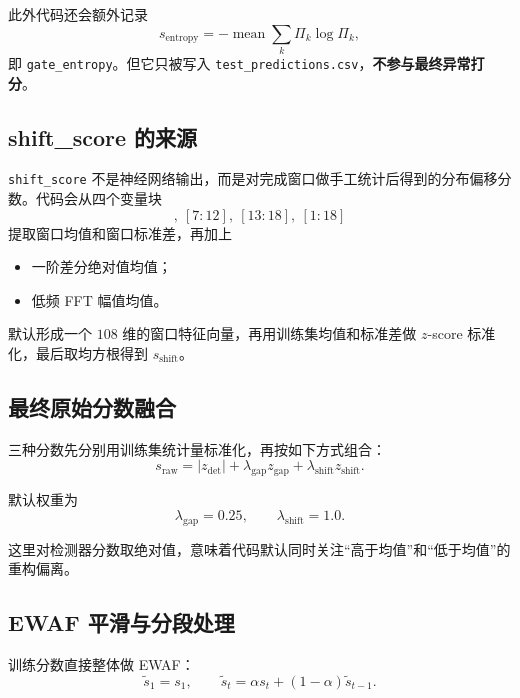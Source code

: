 \documentclass[UTF8]{ctexart}
\newcommand{\code}[1]{\texttt{#1}}
\begin{document}
此外代码还会额外记录
\begin{equation}
    s_{\text{entropy}} = - \operatorname{mean}\sum_k \Pi_k \log \Pi_k,
\end{equation}
即 \code{gate\_entropy}。但它只被写入 \code{test\_predictions.csv}，\textbf{不参与最终异常打分}。

\subsection{shift\_score 的来源}

\code{shift\_score} 不是神经网络输出，而是对完成窗口做手工统计后得到的分布偏移分数。代码会从四个变量块
\begin{equation}
    [1{:}6],\ [7{:}12],\ [13{:}18],\ [1{:}18]
\end{equation}
提取窗口均值和窗口标准差，再加上
\begin{itemize}
    \item 一阶差分绝对值均值；
    \item 低频 FFT 幅值均值。
\end{itemize}

默认形成一个 \(108\) 维的窗口特征向量，再用训练集均值和标准差做 \(z\)-score 标准化，最后取均方根得到 \(s_{\text{shift}}\)。

\subsection{最终原始分数融合}

三种分数先分别用训练集统计量标准化，再按如下方式组合：
\begin{equation}
    s_{\text{raw}}
    =
    |z_{\text{det}}|
    + \lambda_{\text{gap}} z_{\text{gap}}
    + \lambda_{\text{shift}} z_{\text{shift}}.
\end{equation}

默认权重为
\begin{equation}
    \lambda_{\text{gap}} = 0.25,
    \qquad
    \lambda_{\text{shift}} = 1.0.
\end{equation}

这里对检测器分数取绝对值，意味着代码默认同时关注“高于均值”和“低于均值”的重构偏离。

\subsection{EWAF 平滑与分段处理}

训练分数直接整体做 EWAF：
\begin{equation}
    \widetilde{s}_1 = s_1,\qquad
    \widetilde{s}_t = \alpha s_t + (1-\alpha)\widetilde{s}_{t-1}.
\end{equation}
\end{document}
